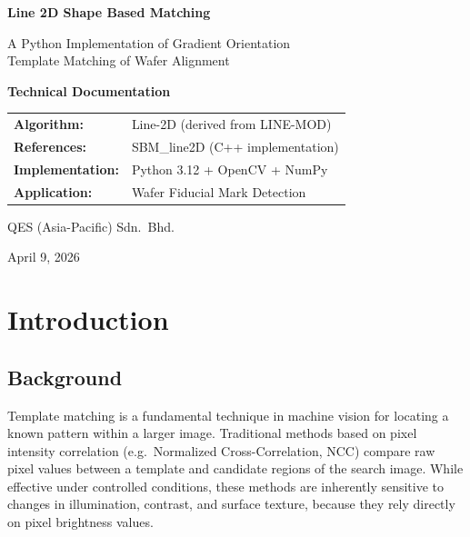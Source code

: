 \documentclass[12pt,a4paper]{article}
\begin{document}
\begin{titlepage}
  \centering
  \vspace*{2cm}
  {\LARGE\bfseries Line 2D Shape Based Matching\par}
  \vspace{0.6cm}
  {\large A Python Implementation of Gradient Orientation\\
           Template Matching of Wafer Alignment\par}
  \vspace{1.8cm}
  {\Huge\bfseries Technical Documentation\par}
  \vspace{2cm}
  \begin{tabular}{@{}ll@{}}
    \textbf{Algorithm:}       & Line-2D (derived from LINE-MOD)     \\[4pt]
    \textbf{References:}      & SBM\_line2D (C++ implementation)     \\[4pt]
    \textbf{Implementation:}  & Python 3.12 + OpenCV + NumPy         \\[4pt]
    \textbf{Application:}     & Wafer Fiducial Mark Detection        \\
  \end{tabular}
  \vfill
  {\large QES (Asia-Pacific) Sdn.\ Bhd.\par}
  {\large April 9, 2026\par}
\end{titlepage}

\tableofcontents
\newpage

\section{Introduction}

\subsection{Background}
Template matching is a fundamental technique in machine vision for locating a known
pattern within a larger image.  Traditional methods based on pixel intensity
correlation (e.g.\ Normalized Cross-Correlation, NCC) compare raw pixel values
between a template and candidate regions of the search image.  While effective under
controlled conditions, these methods are inherently sensitive to changes in
illumination, contrast, and surface texture, because they rely directly on pixel
brightness values.
\end{document}
